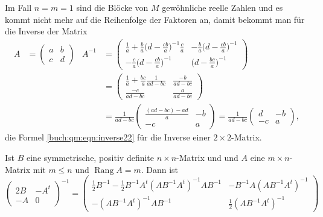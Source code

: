 
\begin{beispiel}
Im Fall $n=m=1$ sind die Blöcke von $M$ gewöhnliche reelle Zahlen und es
kommt nicht mehr auf die Reihenfolge der Faktoren an, damit bekommt man
für die Inverse der Matrix
\begin{align*}
A&=\begin{pmatrix}a&b\\c&d\end{pmatrix}
&
A^{-1}
&=
\begin{pmatrix}
\displaystyle \frac1a + \frac{b}a\biggl(d-\frac{cb}a\biggr)^{-1}\frac{c}a
	&\displaystyle -\frac{b}a \biggl(d-\frac{cb}{a}\biggr)^{-1}
\\[10pt]
\displaystyle -\frac{c}a\biggl(d-\frac{cb}{a}\biggr)^{-1}
	&\displaystyle \biggl(d-\frac{bc}{a}\biggr)^{-1}
\end{pmatrix}
\\
&&&=
\begin{pmatrix}
\displaystyle \frac1a + \frac{bc}{a}\frac{1}{ad-bc}
	&\displaystyle \frac{-b}{ad-bc}
\\[10pt]
\displaystyle \frac{-c}{ad-bc}
	&\displaystyle \frac{a}{ad-bc}
\end{pmatrix}
\\
&&&=
\frac{1}{ad-bc}
\begin{pmatrix}
\displaystyle \frac{(ad-bc)-ad}a&-b\\
-c&a
\end{pmatrix}
=
\frac{1}{ad-bc}
\begin{pmatrix}
 d&-b\\
-c& a
\end{pmatrix},
\end{align*}
die Formel \eqref{buch:qm:eqn:inverse22}
für die Inverse einer $2\times 2$-Matrix.
\end{beispiel}

\begin{korollar}
\label{buch:qm:korollar:quadr}
Ist $B$ eine symmetrische, positiv definite $n\times n$-Matrix und 
und $A$ eine $m\times n$-Matrix mit $m\le n$ und $\operatorname{Rang}A=m$.
Dann ist 
\begin{equation}
\begin{pmatrix}
2B&-A^t \\
-A & 0
\end{pmatrix}^{-1}
=
\begin{pmatrix}
\frac12B^{-1} - \frac12B^{-1}A^t(AB^{-1}A^t)^{-1}AB^{-1}
      & -B^{-1}A(AB^{-1}A^t)^{-1} \\
-(AB^{-1}A^t)^{-1}AB^{-1} & \frac12 (AB^{-1}A^t)^{-1}
\end{pmatrix}
\label{buch:qm:eqn:quadr}
\end{equation}
\end{korollar}

